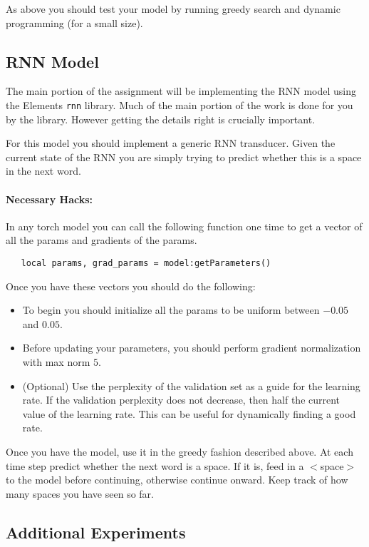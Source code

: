 \documentclass[11pt]{article}
\begin{document}
As above you should test your model 
by running greedy search and dynamic programming (for a small size). 

\subsection{RNN Model}

The main portion of the assignment will be implementing the 
RNN model using the Elements \texttt{rnn} library. Much of the 
main portion of the work is done for you by the library. However 
getting the details right is crucially important. 

For this model you should implement a generic RNN transducer. 
Given the current state of the RNN you are simply trying to predict 
whether this is a space in the next word. 

\paragraph{Necessary Hacks:}
In any torch model you can call the following function one time to get 
a vector of all the params and gradients of the params. 

\begin{lstlisting}
   local params, grad_params = model:getParameters()
\end{lstlisting}

Once you have these vectors you should do the following:
\begin{itemize}
\item To begin you should initialize all the params to be uniform between $-0.05$ and $0.05$.
\item Before updating your parameters, you should perform gradient normalization with max norm $5$.
\item (Optional) Use the perplexity of the validation set as a guide for the learning rate. If the 
  validation perplexity does not decrease, then half the current value of the learning rate. This 
  can be useful for dynamically finding a good rate.
\end{itemize}

Once you have the model, use it in the greedy fashion described above. 
At each time step predict whether the next word is a space. If it is, feed 
in a $<$space$>$ to the model before continuing, otherwise continue onward. 
Keep track of how many spaces you have seen so far. 

\subsection{Additional Experiments}
\end{document}
